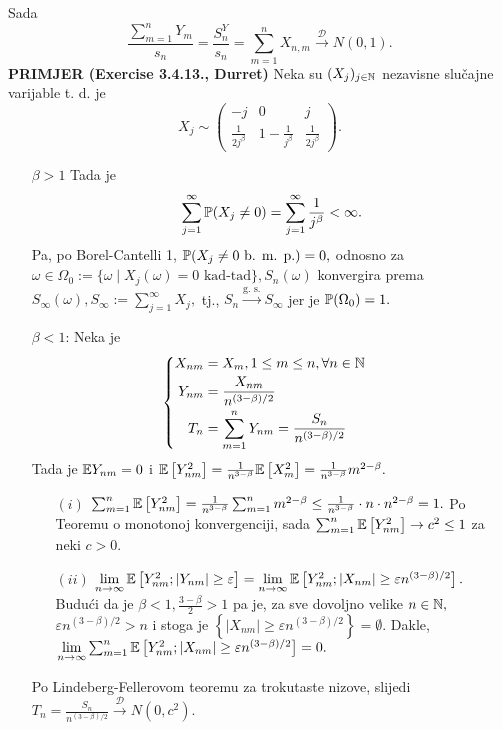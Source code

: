 \documentclass{article}
\begin{document}
 Sada \[\frac{\sum_{m=1}^nY_m}{s_n}=\frac{S_n^Y}{s_n}=\sum_{m=1}^nX_{n,m}\overset{\mathcal D}{\longrightarrow}N(0,1).\]
 \textbf{PRIMJER (Exercise 3.4.13., Durret)}\newline
Neka su \((X_j)_{j\in\Bbb N}\) nezavisne slučajne varijable t. d. je \[X_j\sim\begin{pmatrix}-j&0&j\\\frac1{2j^\beta}&1-\frac1{j^\beta}&\frac1{2j^\beta}\end{pmatrix}.\]
\begin{enumerate}
    \item[\(\beta>1\)] Tada je \[\sum_{j=1}^\infty\Bbb P(X_j\ne0)=\sum_{j=1}^\infty\frac1{j^\beta}<\infty.\] Pa, po Borel-Cantelli 1, \(\Bbb P(X_j\ne 0\text{ b. m. p.})=0,\) odnosno za \(\omega\in\Omega_0:=\{\omega\mid X_j(\omega)=0\text{ kad-tad}\},S_n(\omega)\) konvergira prema \(S_\infty(\omega),S_\infty:=\sum_{j=1}^\infty X_j,\) tj., \(S_n\overset{\text{g. s.}}{\longrightarrow}S_\infty\) jer je \(\Bbb P(\Omega_0)=1.\)
    \item[\(\beta<1\):] Neka je \[\begin{cases}\begin{aligned}X_{nm}&=X_m,1\le m\le n,\forall n\in\Bbb N\\Y_{nm}&=\frac{X_{nm}}{n^{(3-\beta)/2}}\\T_n&=\sum_{m=1}^nY_{nm}=\frac{S_n}{n^{(3-\beta)/2}}\end{aligned}\end{cases}\] Tada je \(\Bbb EY_{nm}=0\) i \(\Bbb E\left[Y_{nm}^2\right]=\frac1{n^{3-\beta}}\Bbb E\left[X_m^2\right]=\frac1{n^{3-\beta}}m^{2-\beta}.\)\begin{enumerate}
        \item[\((i)\)] \(\sum_{m=1}^n\Bbb E\left[Y_{nm}^2\right]=\frac1{n^{3-\beta}}\sum_{m=1}^nm^{2-\beta}\le\frac1{n^{3-\beta}}\cdot n\cdot n^{2-\beta}=1.\) Po Teoremu o monotonoj konvergenciji, sada \(\sum_{m=1}^n\Bbb E\left[Y_{nm}^2\right]\to c^2\le 1\) za neki \(c>0.\)
        \item[\((ii)\)] \(\lim\limits_{n\to\infty}\Bbb E\left[Y_{nm}^2;|Y_{nm}|\ge\varepsilon\right]=\lim\limits_{n\to\infty}\Bbb E\left[Y_{nm}^2;|X_{nm}|\ge\varepsilon n^{(3-\beta)/2}\right].\) Budući da je \(\beta<1,\frac{3-\beta}2>1\) pa je, za sve dovoljno velike \(n\in\Bbb N,\) \(\varepsilon n^{(3-\beta)/2}>n\) i stoga je \(\left\{|X_{nm}|\ge\varepsilon n^{(3-\beta)/2}\right\}=\emptyset.\) Dakle, \(\lim\limits_{n\to\infty}\sum_{m=1}^n\Bbb E\left[Y_{nm}^2;|X_{nm}|\ge\varepsilon n^{(3-\beta)/2}\right]=0.\)
    \end{enumerate} Po Lindeberg-Fellerovom teoremu za trokutaste nizove, slijedi \(T_n=\frac{S_n}{n^{(3-\beta)/2}}\overset{\mathcal D}{\longrightarrow}N(0,c^2).\)

\end{enumerate}
\end{document}
